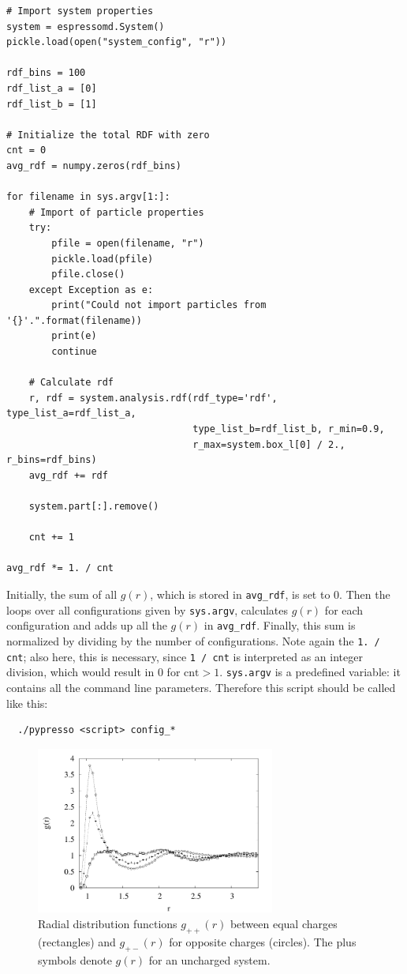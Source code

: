 \documentclass[
a4paper,                        %
11pt,                           %
twoside,                        %
footsepline,                    %
headsepline,                    %
headexclude,                    %
footexclude,                    %
pagesize,                       %
]{scrartcl}
\begin{document}
\begin{lstlisting}
# Import system properties
system = espressomd.System()
pickle.load(open("system_config", "r"))

rdf_bins = 100
rdf_list_a = [0]
rdf_list_b = [1]

# Initialize the total RDF with zero
cnt = 0
avg_rdf = numpy.zeros(rdf_bins)

for filename in sys.argv[1:]:
    # Import of particle properties
    try:
        pfile = open(filename, "r")
        pickle.load(pfile)
        pfile.close()
    except Exception as e:
        print("Could not import particles from '{}'.".format(filename))
        print(e)
        continue

    # Calculate rdf
    r, rdf = system.analysis.rdf(rdf_type='rdf', type_list_a=rdf_list_a,
                                 type_list_b=rdf_list_b, r_min=0.9,
                                 r_max=system.box_l[0] / 2., r_bins=rdf_bins)
    avg_rdf += rdf

    system.part[:].remove()

    cnt += 1

avg_rdf *= 1. / cnt
\end{lstlisting}

Initially, the sum of all $g(r)$, which is stored in \verb|avg_rdf|,
is set to 0.  Then the loops over all configurations given by
\verb|sys.argv|, calculates $g(r)$ for each configuration and adds up all
the $g(r)$ in \verb|avg_rdf|.  Finally, this sum is normalized by
dividing by the number of configurations. Note again the
\verb|1. / cnt|; also here, this is necessary, since \verb|1 / cnt| is 
interpreted as an integer division, which would result in 0 for $\text{cnt}>1$. 
 \verb|sys.argv| is a predefined variable: it contains all the command line 
parameters. Therefore this script should be called like this:
\begin{verbatim}
  ./pypresso <script> config_*
\end{verbatim}

\begin{figure}[tb]
  \centering
  \includegraphics[width=0.7\textwidth]{figures/nacl-rdf}
  \caption{Radial distribution functions $g_{++}(r)$ between equal
    charges (rectangles) and $g_{+-}(r)$ for opposite charges
    (circles). The plus symbols denote $g(r)$ for an uncharged
    system.}
  \label{fig:rdf}
\end{figure}
\end{document}
